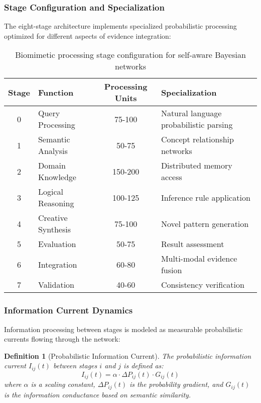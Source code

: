 \documentclass[12pt,a4paper]{article}
\newtheorem{definition}[theorem]{Definition}
\begin{document}
\subsubsection{Stage Configuration and Specialization}

The eight-stage architecture implements specialized probabilistic processing optimized for different aspects of evidence integration:

\begin{table}[H]
\centering
\begin{tabular}{clcl}
\toprule
\textbf{Stage} & \textbf{Function} & \textbf{Processing Units} & \textbf{Specialization} \\
\midrule
0 & Query Processing & 75-100 & Natural language probabilistic parsing \\
1 & Semantic Analysis & 50-75 & Concept relationship networks \\
2 & Domain Knowledge & 150-200 & Distributed memory access \\
3 & Logical Reasoning & 100-125 & Inference rule application \\
4 & Creative Synthesis & 75-100 & Novel pattern generation \\
5 & Evaluation & 50-75 & Result assessment \\
6 & Integration & 60-80 & Multi-modal evidence fusion \\
7 & Validation & 40-60 & Consistency verification \\
\bottomrule
\end{tabular}
\caption{Biomimetic processing stage configuration for self-aware Bayesian networks}
\end{table}

\subsubsection{Information Current Dynamics}

Information processing between stages is modeled as measurable probabilistic currents flowing through the network:

\begin{definition}[Probabilistic Information Current]
The probabilistic information current $I_{ij}(t)$ between stages $i$ and $j$ is defined as:
\begin{equation}
I_{ij}(t) = \alpha \cdot \Delta P_{ij}(t) \cdot G_{ij}(t)
\end{equation}
where $\alpha$ is a scaling constant, $\Delta P_{ij}(t)$ is the probability gradient, and $G_{ij}(t)$ is the information conductance based on semantic similarity.
\end{definition}
\end{document}
